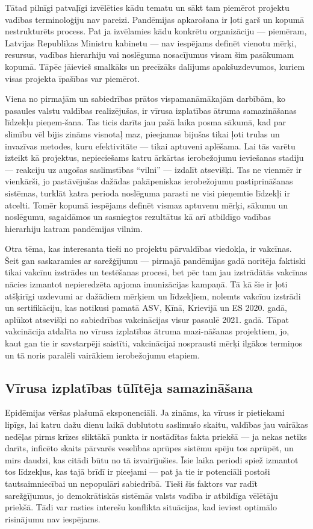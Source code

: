 \documentclass[12pt, a4paper]{article}
\numberwithin{equation}{section} %
\begin{document}
Tātad pilnīgi patvaļīgi izvēlēties kādu tematu un sākt tam piemērot projektu vadības terminoloģiju nav pareizi. Pandēmijas apkarošana ir ļoti garš un kopumā nestrukturēts process. Pat ja izvēlamies kādu konkrētu organizāciju --- piemēram, Latvijas Republikas Ministru kabinetu --- nav iespējams definēt vienotu mērķi, resursus, vadības hierarhiju vai noslēguma nosacījumus visam šim pasākumam kopumā. Tāpēc jāievieš smalkāks un precīzāks dalījums apakšuzdevumos, kuriem visas projekta īpašības var piemērot.

Viena no pirmajām un sabiedrības prātos vispamanāmākajām darbībām, ko pasaules valstu valdības realizējušas, ir vīrusa izplatības ātruma samazināšanas līdzekļu pieņem-šana. Tas ticis darīts jau pašā laika posma sākumā, kad par slimību vēl bijis zināms visnotaļ maz, pieejamas bijušas tikai ļoti trulas un invazīvas metodes, kuru efektivitāte --- tikai aptuveni aplēšama. Lai tās varētu izteikt kā projektus, nepieciešams katru ārkārtas ierobežojumu ieviešanas stadiju --- reakciju uz augošas saslimstības ``vilni'' --- izdalīt atsevišķi. Tas ne vienmēr ir vienkārši, jo pastāvējušas dažādas pakāpeniskas ierobežojumu pastiprināšanas sistēmas, turklāt katra perioda noslēguma parasti ne visi pieņemtie līdzekļi ir atcelti. Tomēr kopumā iespējams definēt vismaz aptuvenu mērķi, sākumu un noslēgumu, sagaidāmos un sasniegtos rezultātus kā arī atbildīgo vadības hierarhiju katram pandēmijas vilnim.

Otra tēma, kas interesanta tieši no projektu pārvaldības viedokļa, ir vakcīnas. Šeit gan saskaramies ar sarežģījumu --- pirmajā pandēmijas gadā noritēja faktiski tikai vakcīnu izstrādes un testēšanas procesi, bet pēc tam jau izstrādātās vakcīnas nācies izmantot nepieredzēta apjoma imunizācijas kampaņā. Tā kā šie ir ļoti atšķirīgi uzdevumi ar dažādiem mērķiem un līdzekļiem, nolemts vakcīnu izstrādi un sertifikāciju, kas notikusi pamatā ASV, Ķīnā, Krievijā un ES 2020. gadā, aplūkot atsevišķi no sabiedrības vakcinācijas visur pasaulē 2021. gadā. Tāpat vakcinācija atdalīta no vīrusa izplatības ātruma mazi-nāšanas projektiem, jo, kaut gan tie ir savstarpēji saistīti, vakcinācijai nosprausti mērķi ilgākos termiņos un tā noris paralēli vairākiem ierobežojumu etapiem.

\subsection{Vīrusa izplatības tūlītēja samazināšana}

Epidēmijas vēršas plašumā eksponenciāli. Ja zināms, ka vīruss ir pietiekami lipīgs, lai katru dažu dienu laikā dublutotu saslimušo skaitu, valdības jau vairākas nedēļas pirms krīzes sliktākā punkta ir nostādītas fakta priekšā --- ja nekas netiks darīts, inficēto skaits pārvarēs veselības aprūpes sistēmu spēju tos aprūpēt, un mirs daudzi, kas citādi būtu no tā izvairījušies. Īsie laika periodi spiež izmantot tos līdzekļus, kas tajā brīdī ir pieejami --- pat ja tie ir potenciāli postoši tautsaimniecībai un nepopulāri sabiedrībā. Tieši šis faktors var radīt sarežģījumus, jo demokrātiskās sistēmās valsts vadība ir atbildīga vēlētāju priekšā. Tādi var rasties interešu konflikta situācijas, kad ieviest optimālo risinājumu nav iespējams.
\end{document}

